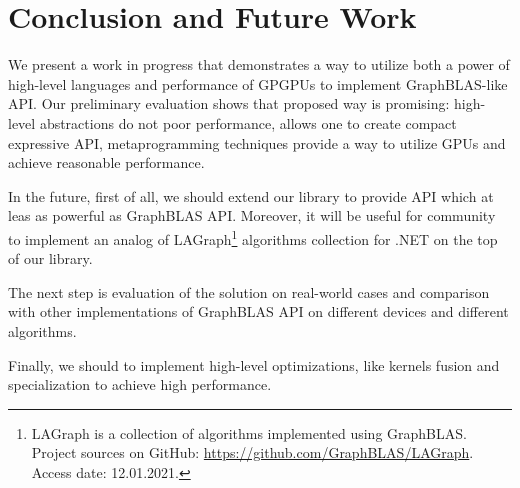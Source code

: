 \section{Conclusion and Future Work}

We present a work in progress that demonstrates a way to utilize both a power of high-level languages and performance of GPGPUs to implement GraphBLAS-like API.
Our preliminary evaluation shows that proposed way is promising: high-level abstractions do not poor performance, allows one to create compact expressive API, metaprogramming techniques provide a way to utilize GPUs and achieve reasonable performance.

In the future, first of all, we should extend our library to provide API which at leas as powerful as GraphBLAS API. 
Moreover, it will be useful for community to implement an analog of LAGraph\footnote{LAGraph is a collection of algorithms implemented using GraphBLAS. Project sources on GitHub: \url{https://github.com/GraphBLAS/LAGraph}. Access date: 12.01.2021.} algorithms collection for .NET on the top of our library.

The next step is evaluation of the solution on real-world cases and comparison with other implementations of GraphBLAS API on different devices and different algorithms.

Finally, we should to implement high-level optimizations, like kernels fusion and specialization to achieve high performance.


